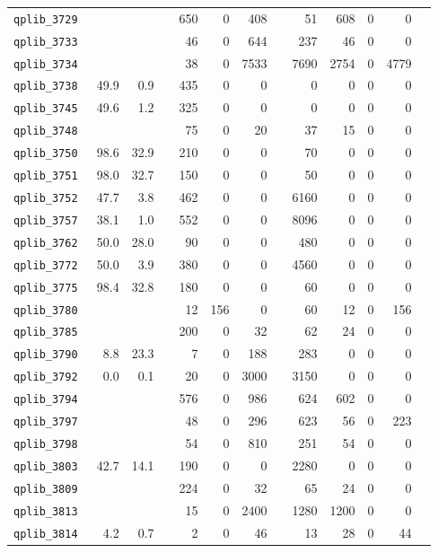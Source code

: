 {\begin{longtable}{lrrrrrrrrrrrr}
{\tt 	qplib\_3729	}	&		&		&	&	650	&	0	&	408	&	&	51	&	608	&	0	&	0	\\
{\tt 	qplib\_3733	}	&		&		&	&	46	&	0	&	644	&	&	237	&	46	&	0	&	0	\\
{\tt 	qplib\_3734	}	&		&		&	&	38	&	0	&	7533	&	&	7690	&	2754	&	0	&	4779	\\
{\tt 	qplib\_3738	}	&	49.9	&	0.9	&	&	435	&	0	&	0	&	&	0	&	0	&	0	&	0	\\
{\tt 	qplib\_3745	}	&	49.6	&	1.2	&	&	325	&	0	&	0	&	&	0	&	0	&	0	&	0	\\
{\tt 	qplib\_3748	}	&		&		&	&	75	&	0	&	20	&	&	37	&	15	&	0	&	0	\\
{\tt 	qplib\_3750	}	&	98.6	&	32.9	&	&	210	&	0	&	0	&	&	70	&	0	&	0	&	0	\\
{\tt 	qplib\_3751	}	&	98.0	&	32.7	&	&	150	&	0	&	0	&	&	50	&	0	&	0	&	0	\\
{\tt 	qplib\_3752	}	&	47.7	&	3.8	&	&	462	&	0	&	0	&	&	6160	&	0	&	0	&	0	\\
{\tt 	qplib\_3757	}	&	38.1	&	1.0	&	&	552	&	0	&	0	&	&	8096	&	0	&	0	&	0	\\
{\tt 	qplib\_3762	}	&	50.0	&	28.0	&	&	90	&	0	&	0	&	&	480	&	0	&	0	&	0	\\
{\tt 	qplib\_3772	}	&	50.0	&	3.9	&	&	380	&	0	&	0	&	&	4560	&	0	&	0	&	0	\\
{\tt 	qplib\_3775	}	&	98.4	&	32.8	&	&	180	&	0	&	0	&	&	60	&	0	&	0	&	0	\\
{\tt 	qplib\_3780	}	&		&		&	&	12	&	156	&	0	&	&	60	&	12	&	0	&	156	\\
{\tt 	qplib\_3785	}	&		&		&	&	200	&	0	&	32	&	&	62	&	24	&	0	&	0	\\
{\tt 	qplib\_3790	}	&	8.8	&	23.3	&	&	7	&	0	&	188	&	&	283	&	0	&	0	&	0	\\
{\tt 	qplib\_3792	}	&	0.0	&	0.1	&	&	20	&	0	&	3000	&	&	3150	&	0	&	0	&	0	\\
{\tt 	qplib\_3794	}	&		&		&	&	576	&	0	&	986	&	&	624	&	602	&	0	&	0	\\
{\tt 	qplib\_3797	}	&		&		&	&	48	&	0	&	296	&	&	623	&	56	&	0	&	223	\\
{\tt 	qplib\_3798	}	&		&		&	&	54	&	0	&	810	&	&	251	&	54	&	0	&	0	\\
{\tt 	qplib\_3803	}	&	42.7	&	14.1	&	&	190	&	0	&	0	&	&	2280	&	0	&	0	&	0	\\
{\tt 	qplib\_3809	}	&		&		&	&	224	&	0	&	32	&	&	65	&	24	&	0	&	0	\\
{\tt 	qplib\_3813	}	&		&		&	&	15	&	0	&	2400	&	&	1280	&	1200	&	0	&	0	\\
{\tt 	qplib\_3814	}	&	4.2	&	0.7	&	&	2	&	0	&	46	&	&	13	&	28	&	0	&	44	\\

\end{longtable}}
